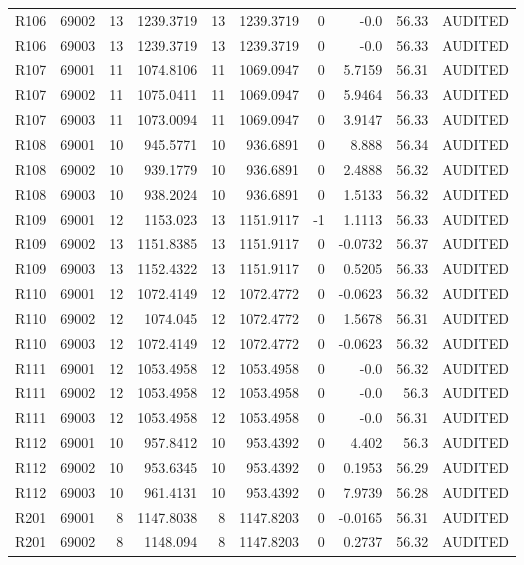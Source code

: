 \begin{tabular}{lrrrrrrrrr}
R106 & 69002 & 13 & 1239.3719 & 13 & 1239.3719 & 0 & -0.0 & 56.33 & AUDITED \\
R106 & 69003 & 13 & 1239.3719 & 13 & 1239.3719 & 0 & -0.0 & 56.33 & AUDITED \\
R107 & 69001 & 11 & 1074.8106 & 11 & 1069.0947 & 0 & 5.7159 & 56.31 & AUDITED \\
R107 & 69002 & 11 & 1075.0411 & 11 & 1069.0947 & 0 & 5.9464 & 56.33 & AUDITED \\
R107 & 69003 & 11 & 1073.0094 & 11 & 1069.0947 & 0 & 3.9147 & 56.33 & AUDITED \\
R108 & 69001 & 10 & 945.5771 & 10 & 936.6891 & 0 & 8.888 & 56.34 & AUDITED \\
R108 & 69002 & 10 & 939.1779 & 10 & 936.6891 & 0 & 2.4888 & 56.32 & AUDITED \\
R108 & 69003 & 10 & 938.2024 & 10 & 936.6891 & 0 & 1.5133 & 56.32 & AUDITED \\
R109 & 69001 & 12 & 1153.023 & 13 & 1151.9117 & -1 & 1.1113 & 56.33 & AUDITED \\
R109 & 69002 & 13 & 1151.8385 & 13 & 1151.9117 & 0 & -0.0732 & 56.37 & AUDITED \\
R109 & 69003 & 13 & 1152.4322 & 13 & 1151.9117 & 0 & 0.5205 & 56.33 & AUDITED \\
R110 & 69001 & 12 & 1072.4149 & 12 & 1072.4772 & 0 & -0.0623 & 56.32 & AUDITED \\
R110 & 69002 & 12 & 1074.045 & 12 & 1072.4772 & 0 & 1.5678 & 56.31 & AUDITED \\
R110 & 69003 & 12 & 1072.4149 & 12 & 1072.4772 & 0 & -0.0623 & 56.32 & AUDITED \\
R111 & 69001 & 12 & 1053.4958 & 12 & 1053.4958 & 0 & -0.0 & 56.32 & AUDITED \\
R111 & 69002 & 12 & 1053.4958 & 12 & 1053.4958 & 0 & -0.0 & 56.3 & AUDITED \\
R111 & 69003 & 12 & 1053.4958 & 12 & 1053.4958 & 0 & -0.0 & 56.31 & AUDITED \\
R112 & 69001 & 10 & 957.8412 & 10 & 953.4392 & 0 & 4.402 & 56.3 & AUDITED \\
R112 & 69002 & 10 & 953.6345 & 10 & 953.4392 & 0 & 0.1953 & 56.29 & AUDITED \\
R112 & 69003 & 10 & 961.4131 & 10 & 953.4392 & 0 & 7.9739 & 56.28 & AUDITED \\
R201 & 69001 & 8 & 1147.8038 & 8 & 1147.8203 & 0 & -0.0165 & 56.31 & AUDITED \\
R201 & 69002 & 8 & 1148.094 & 8 & 1147.8203 & 0 & 0.2737 & 56.32 & AUDITED \\

\end{tabular}
